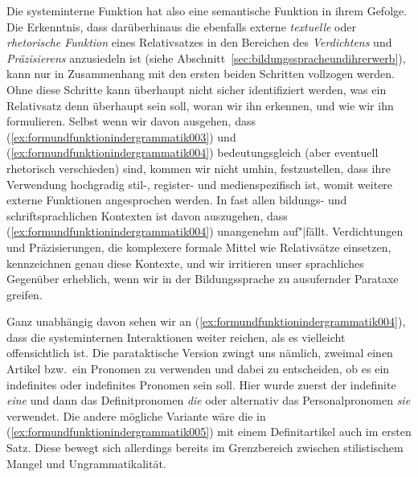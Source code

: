 \begin{exe}
\end{exe}

Die systeminterne Funktion hat also eine semantische Funktion in ihrem Gefolge.
Die Erkenntnis, dass darüberhinaus die ebenfalls externe \textit{textuelle} oder \textit{rhetorische Funktion} eines Relativsatzes in den Bereichen des \textit{Verdichtens} und \textit{Präzisierens} anzusiedeln ist (siehe Abschnitt~\ref{sec:bildungsspracheundihrerwerb}), kann nur in Zusammenhang mit den ersten beiden Schritten vollzogen werden.
Ohne diese Schritte kann überhaupt nicht sicher identifiziert werden, was ein Relativsatz denn überhaupt sein soll, woran wir ihn erkennen, und wie wir ihn formulieren.
Selbst wenn wir davon ausgehen, dass (\ref{ex:formundfunktionindergrammatik003}) und (\ref{ex:formundfunktionindergrammatik004}) bedeutungsgleich (aber eventuell rhetorisch verschieden) sind, kommen wir nicht umhin, festzustellen, dass ihre Verwendung hochgradig stil-, register- und medienspezifisch ist, womit weitere externe Funktionen angesprochen werden.
In fast allen bildungs- und schriftsprachlichen Kontexten ist davon auszugehen, dass (\ref{ex:formundfunktionindergrammatik004}) unangenehm auf"|fällt.
Verdichtungen und Präzisierungen, die komplexere formale Mittel wie Relativsätze einsetzen, kennzeichnen genau diese Kontexte, und wir irritieren unser sprachliches Gegenüber erheblich, wenn wir in der Bildungssprache zu ausufernder Parataxe greifen.

Ganz unabhängig davon sehen wir an (\ref{ex:formundfunktionindergrammatik004}), dass die systeminternen Interaktionen weiter reichen, als es vielleicht offensichtlich ist.
Die parataktische Version zwingt uns nämlich, zweimal einen Artikel bzw.\ ein Pronomen zu verwenden und dabei zu entscheiden, ob es ein indefinites oder indefinites Pronomen sein soll.
Hier wurde zuerst der indefinite \textit{eine} und dann das Definitpronomen \textit{die} oder alternativ das Personalpronomen \textit{sie} verwendet.
Die andere mögliche Variante wäre die in (\ref{ex:formundfunktionindergrammatik005}) mit einem Definitartikel auch im ersten Satz.
Diese bewegt sich allerdings bereits im Grenzbereich zwischen stilistischem Mangel und Ungrammatikalität.

\begin{exe}
\end{exe}

